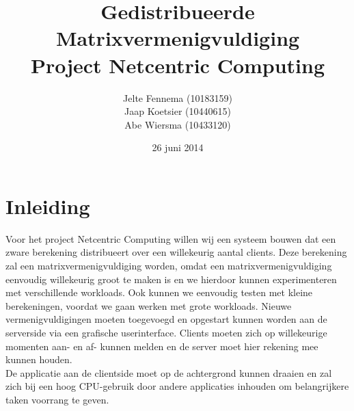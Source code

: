 \documentclass[11pt]{article}
\title{\textbf{Gedistribueerde Matrixvermenigvuldiging}\\
                Project Netcentric Computing}
\author{Jelte Fennema (10183159)\\
		Jaap Koetsier (10440615)\\
        Abe Wiersma (10433120)}
\date{26 juni 2014}
\begin{document}
\maketitle

\section{Inleiding}
Voor het project Netcentric Computing willen wij een systeem bouwen dat een zware
berekening distribueert over een willekeurig aantal clients. Deze berekening zal een
matrixvermenigvuldiging worden, omdat een matrixvermenigvuldiging eenvoudig willekeurig
groot te maken is en we hierdoor kunnen experimenteren met verschillende workloads. Ook
kunnen we eenvoudig testen met kleine berekeningen, voordat we gaan werken met grote
workloads. Nieuwe vermenigvuldigingen moeten toegevoegd en opgestart kunnen worden aan
de serverside via een grafische userinterface. Clients moeten zich op willekeurige momenten
aan- en af- kunnen melden en de server moet hier rekening mee kunnen houden.\\
De applicatie aan de clientside moet op de achtergrond kunnen draaien en zal zich bij een
hoog CPU-gebruik door andere applicaties inhouden om belangrijkere taken voorrang te geven.
\end{document}
